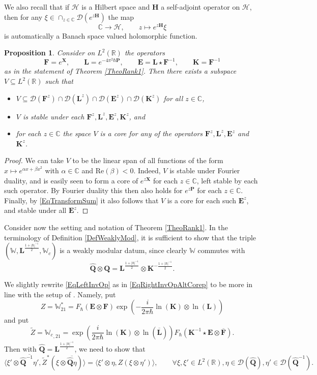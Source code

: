 \documentclass[11pt, reqno]{amsart}
\newtheorem{prop}[theorem]{Proposition}
\theoremstyle{definition}
\numberwithin{equation}{section}
\def\C{\mathbb C}
\def\msD{\mathscr D}
\def\R{\mathbb R}
\newcommand{\Hsp}{\mathcal{H}}
\newcommand{\Qb}{\mathbf{Q}}
\newcommand{\Pb}{\mathbf{P}}
\newcommand{\Xb}{\mathbf{X}}
\newcommand{\Eb}{\mathbf{E}}
\newcommand{\Fb}{\mathbf{F}}
\newcommand{\Kb}{\mathbf{K}}
\newcommand{\Lb}{\mathbf{L}}
\newcommand{\Hb}{\mathbf{H}}
\newcommand{\Ree}{\mathrm{Re}}
\newcommand{\Wbb}{\mathbb{W}}
\newcommand{\wWbb}{\mathbb{W}_c}
\begin{document}
We also recall that if $\Hsp$ is a Hilbert space and $\Hb$ a self-adjoint operator on $\Hsp$, then for any $\xi \in \cap_{z\in \C} \msD(e^{z\Hb})$ the map
\[
\C\rightarrow \Hsp,\qquad z\mapsto e^{z \Hb}\xi
\]
is automatically a Banach space valued holomorphic function.

\begin{prop}\label{PropDenseSubspCor}
Consider on $L^2(\R)$ the operators 
\[
\Fb = e^{\Xb},\qquad \Lb = e^{-4\pi^2 \hbar \Pb},\qquad \Eb = \Lb\star\Fb^{-1},\qquad  \Kb = \Fb^{-1}
\]
as in the statement of Theorem \ref{TheoRank1}. Then there exists a subspace $V \subseteq L^2(\R)$ such that 
\begin{itemize}
\item $V \subseteq \msD(\Fb^z) \cap \msD(\Lb^z) \cap \msD(\Eb^z) \cap \msD(\Kb^z)$ for all $z\in \C$,
\item $V$ is stable under each $\Fb^z,\Lb^z,\Eb^z,\Kb^z$, and
\item  for each $z\in \C$ the space $V$ is a core for any of the operators $\Fb^z,\Lb^z,\Eb^z$ and $\Kb^z$. 
\end{itemize} 
\end{prop}
\begin{proof}
We can take $V$ to be the linear span of all functions of the form $x\mapsto e^{\alpha x +\beta x^2}$ with $\alpha\in \C$ and $\Ree(\beta)<0$. Indeed, $V$ is stable under Fourier duality, and is easily seen to form a core of $e^{z\Xb}$ for each $z\in \C$, left stable by each such operator. By Fourier duality this then also holds for $e^{z\Pb}$ for each $z\in\C$. Finally, by \eqref{EqTransformSum} it also follows that $V$ is a core for each such $\Eb^z$, and stable under all $\Eb^z$. 
\end{proof} 

Consider now the setting and notation of Theorem \ref{TheoRank1}. In the terminology of Definition \ref{DefWeaklyMod}, it is sufficient to show that the triple $(\Wbb,\Lb^{\frac{1+|\hbar|^{-1}}{2}},\wWbb)$ is a weakly modular datum, since clearly $\Wbb$ commutes with 
\[
\hat{\Qb}\otimes \Qb = \Lb^{\frac{1+|\hbar|^{-1}}{2}} \otimes \Kb^{-\frac{1+|\hbar|^{-1}}{2}}.
\]

We slightly rewrite \eqref{EqLeftInvOp} as in \eqref{EqRightInvOpAltCorep} to be more in line with the setup of \cite{WZ02}. Namely, put  
\begin{equation}\label{EqAltZExpr}
Z = \Wbb_{21}^* = F_{\hbar}(\Eb\otimes \Fb)\exp\left(-\frac{i}{2\pi \hbar} \ln(\Kb)\otimes \ln(\Lb)\right)
\end{equation}
 and put 
\[
\widetilde{Z} = {\wWbb}_{,21} = \exp\left(\frac{i}{2\pi \hbar} \ln(\Kb) \otimes \ln(\overline{\Lb})\right) F_{\hbar}(\Kb^{-1}\star\Eb\otimes \overline{\Fb}).
\]
Then with $\hat{\Qb} = \Lb^{\frac{1+|\hbar|^{-1}}{2}}$, we need to show that
\begin{equation}\label{EqHelpInvRep}
\langle \xi'\otimes \overline{\hat{\Qb}^{-1}\eta'},\widetilde{Z}^*(\xi\otimes \overline{\hat{\Qb}\eta})\rangle = \langle \xi'\otimes \eta,Z(\xi\otimes \eta')\rangle,\qquad \forall \xi,\xi'\in L^2(\R),\eta\in \msD(\hat{\Qb}),\eta'\in \msD(\hat{\Qb}^{-1}). 
\end{equation}
\end{document}
